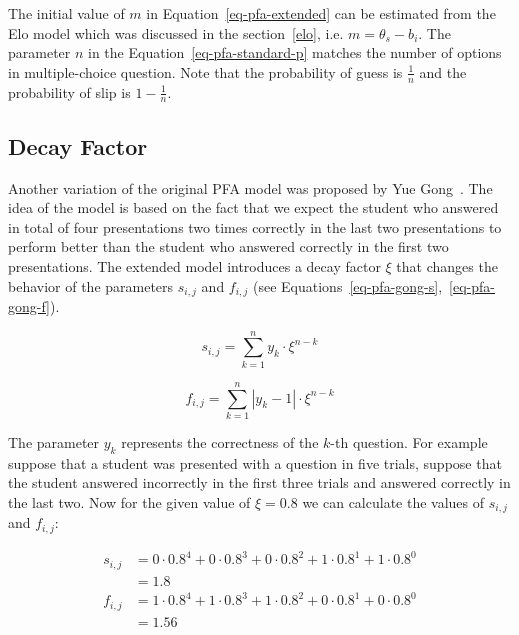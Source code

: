 The initial value of $m$ in Equation~\ref{eq-pfa-extended} can be estimated from the Elo model which was discussed in the section~\ref{elo}, i.e. $m = \theta_s - b_i$. The parameter $n$ in the Equation~\ref{eq-pfa-standard-p} matches the number of options in multiple-choice question. Note that the probability of guess is $\frac{1}{n}$ and the probability of slip is $1 - \frac{1}{n}$.

\subsection*{Decay Factor}
\label{pfag}

Another variation of the original PFA model was proposed by Yue Gong~\cite{Gong2011}. The idea of the model is based on the fact that we expect the student who answered in total of four presentations two times correctly in the last two presentations to perform better than the student who answered correctly in the first two presentations. The extended model introduces a decay factor $\xi$ that changes the behavior of the parameters $s_{i,j}$ and $f_{i,j}$ (see Equations~\ref{eq-pfa-gong-s},~\ref{eq-pfa-gong-f}).

\begin{equation} \label{eq-pfa-gong-s}
  s_{i,j} = \sum_{k=1}^{n} y_k \cdot \xi^{n-k}
\end{equation}

\begin{equation} \label{eq-pfa-gong-f}
  f_{i,j} = \sum_{k=1}^{n} |y_k - 1| \cdot \xi^{n-k}
\end{equation}

The parameter $y_k$ represents the correctness of the $k$-th question. For example suppose that a student was presented with a question in five trials, suppose that the student answered incorrectly in the first three trials and answered correctly in the last two. Now for the given value of $\xi = 0.8$ we can calculate the values of $s_{i,j}$ and $f_{i,j}$:

\begin{equation} \label{eq-pfa-gong-s-example}
  \begin{split}
  s_{i,j} & = 0 \cdot 0.8^4 + 0 \cdot 0.8^3 + 0 \cdot 0.8^2 + 1 \cdot 0.8^1 + 1 \cdot 0.8^0 \\
  & = 1.8 \\
  f_{i,j} & = 1 \cdot 0.8^4 + 1 \cdot 0.8^3 + 1 \cdot 0.8^2 + 0 \cdot 0.8^1 + 0 \cdot 0.8^0 \\
  & = 1.56
  \end{split}
\end{equation}

